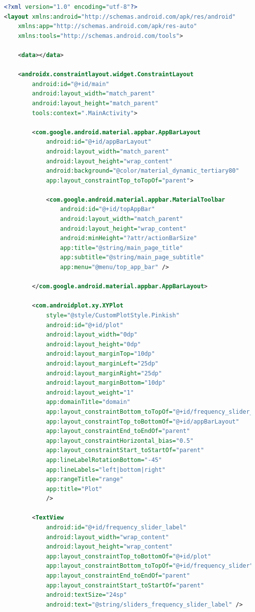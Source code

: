 \documentclass[oneside,solution]{android-assign}
\begin{document}
\begin{lstlisting}[language=xml]
<?xml version="1.0" encoding="utf-8"?>
<layout xmlns:android="http://schemas.android.com/apk/res/android"
    xmlns:app="http://schemas.android.com/apk/res-auto"
    xmlns:tools="http://schemas.android.com/tools">

    <data></data>

    <androidx.constraintlayout.widget.ConstraintLayout
        android:id="@+id/main"
        android:layout_width="match_parent"
        android:layout_height="match_parent"
        tools:context=".MainActivity">

        <com.google.android.material.appbar.AppBarLayout
            android:id="@+id/appBarLayout"
            android:layout_width="match_parent"
            android:layout_height="wrap_content"
            android:background="@color/material_dynamic_tertiary80"
            app:layout_constraintTop_toTopOf="parent">

            <com.google.android.material.appbar.MaterialToolbar
                android:id="@+id/topAppBar"
                android:layout_width="match_parent"
                android:layout_height="wrap_content"
                android:minHeight="?attr/actionBarSize"
                app:title="@string/main_page_title"
                app:subtitle="@string/main_page_subtitle"
                app:menu="@menu/top_app_bar" />

        </com.google.android.material.appbar.AppBarLayout>

        <com.androidplot.xy.XYPlot
            style="@style/CustomPlotStyle.Pinkish"
            android:id="@+id/plot"
            android:layout_width="0dp"
            android:layout_height="0dp"
            android:layout_marginTop="10dp"
            android:layout_marginLeft="25dp"
            android:layout_marginRight="25dp"
            android:layout_marginBottom="10dp"
            android:layout_weight="1"
            app:domainTitle="domain"
            app:layout_constraintBottom_toTopOf="@+id/frequency_slider_label"
            app:layout_constraintTop_toBottomOf="@+id/appBarLayout"
            app:layout_constraintEnd_toEndOf="parent"
            app:layout_constraintHorizontal_bias="0.5"
            app:layout_constraintStart_toStartOf="parent"
            app:lineLabelRotationBottom="-45"
            app:lineLabels="left|bottom|right"
            app:rangeTitle="range"
            app:title="Plot"
            />

        <TextView
            android:id="@+id/frequency_slider_label"
            android:layout_width="wrap_content"
            android:layout_height="wrap_content"
            app:layout_constraintTop_toBottomOf="@+id/plot"
            app:layout_constraintBottom_toTopOf="@+id/frequency_slider"
            app:layout_constraintEnd_toEndOf="parent"
            app:layout_constraintStart_toStartOf="parent"
            android:textSize="24sp"
            android:text="@string/sliders_frequency_slider_label" />


\end{lstlisting}
\end{document}
